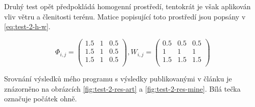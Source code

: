 \documentclass[11pt,a4paper]{scrartcl}
\begin{document}
	Druhý test opět předpokládá homogenní prostředí, tentokrát je však aplikován vliv větru a členitosti terénu. Matice popisující toto prostředí jsou popsány v \ref{eq:test-2-h-w}.
	
	\begin{equation}
	\Phi_{i,j} =
	\begin{pmatrix}
	1.5       & 1 & 0.5 \\
	1.5       & 1 & 0.5 \\
	1.5       & 1 & 0.5 \\
	\end{pmatrix}, 
	W_{i,j} = 
	\begin{pmatrix}
	0.5       & 0.5 & 0.5 \\
	1       & 1 & 1 \\
	1.5       & 1.5 & 1.5 \\	
	\end{pmatrix}
	\label{eq:test-2-h-w}
	\end{equation}
	
	Srovnání výsledků mého programu s výsledky publikovanými v článku je znázorněno na obrázcích \ref{fig:test-2-res-art} a \ref{fig:test-2-res-mine}. Bílá tečka označuje počátek ohně. 
	
\end{document}
